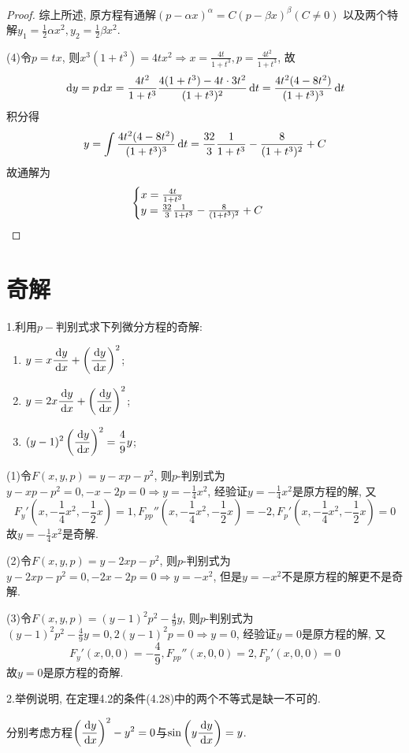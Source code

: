 \begin{proof}
综上所述, 原方程有通解$(p-\alpha x)^{\alpha}=C(p-\beta x)^{\beta}(C\neq0)$
以及两个特解$y_1=\frac{1}{2}\alpha x^2,y_2=\frac{1}{2}\beta x^2$.

(4)令$p=tx$, 则$x^3(1+t^3)=4tx^2\Rightarrow x=\frac{4t}{1+t^3},p=\frac{4t^2}{1+t^3}$, 故
\[\,\mathrm{d} y=p\,\mathrm{d} x=\frac{4t^2}{1+t^3}\frac{4(1+t^3)-4t\cdot3t^2}{(1+t^3)^2}\,\mathrm{d} t=\frac{4t^2(4-8t^2)}{(1+t^3)^3}\,\mathrm{d} t\]
积分得
\[y=\int\frac{4t^2(4-8t^2)}{(1+t^3)^3}\,\mathrm{d} t=\frac{32}{3}\frac{1}{1+t^3}-\frac{8}{(1+t^3)^2}+C\]
故通解为\[\begin{cases}
x=\frac{4t}{1+t^3}\\y=\frac{32}{3}\frac{1}{1+t^3}-\frac{8}{(1+t^3)^2}+C
\end{cases}\qedhere\]
\end{proof}


\section{奇解}


1.利用$p-$判别式求下列微分方程的奇解:
\begin{enumerate}[(1)]
\item $\displaystyle y=x\frac{\,\mathrm{d} y}{\,\mathrm{d} x}+\left(\frac{\,\mathrm{d} y}{\,\mathrm{d} x}\right)^2$;
\item $\displaystyle y=2x\frac{\,\mathrm{d} y}{\,\mathrm{d} x}+\left(\frac{\,\mathrm{d} y}{\,\mathrm{d} x}\right)^2$;
\item $\displaystyle (y-1)^2\left(\frac{\,\mathrm{d} y}{\,\mathrm{d} x}\right)^2=\frac{4}{9}y$;
\end{enumerate}

\begin{solve} 
(1)令$F(x,y,p)=y-xp-p^2$, 则$p$-判别式为$y-xp-p^2=0,-x-2p=0\Rightarrow y=-\frac{1}{4}x^2$, 经验证$y=-\frac{1}{4}x^2$是原方程的解, 又
\[F_y'\left(x,-\frac{1}{4}x^2,-\frac{1}{2}x\right)=1,F_{pp}''\left(x,-\frac{1}{4}x^2,-\frac{1}{2}x\right)=-2,F_p'\left(x,-\frac{1}{4}x^2,-\frac{1}{2}x\right)=0\]
故$y=-\frac{1}{4}x^2$是奇解.

(2)令$F(x,y,p)=y-2xp-p^2$, 则$p$-判别式为$y-2xp-p^2=0,-2x-2p=0\Rightarrow y=-x^2$, 但是$y=-x^2$不是原方程的解更不是奇解.

(3)令$F(x,y,p)=(y-1)^2p^2-\frac{4}{9}y$, 则$p$-判别式为$(y-1)^2p^2-\frac{4}{9}y=0,2(y-1)^2p=0\Rightarrow y=0$, 经验证$y=0$是原方程的解, 又
\[F_y'(x,0,0)=-\frac{4}{9},F_{pp}''(x,0,0)=2,F_p'(x,0,0)=0\]
故$y=0$是原方程的奇解.
\end{solve}


2.举例说明, 在定理4.2的条件(4.28)中的两个不等式是缺一不可的.
\begin{solve}  
分别考虑方程$\displaystyle\left(\frac{\,\mathrm{d} y}{\,\mathrm{d} x}\right)^2-y^2=0$与$\displaystyle\sin\left(y\frac{\,\mathrm{d} y}{\,\mathrm{d} x}\right)=y$.
\end{solve}


